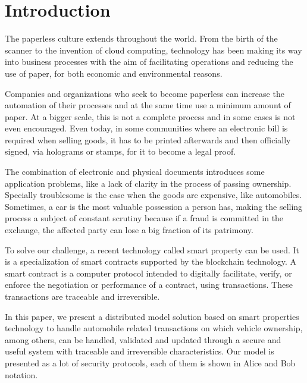 \section{Introduction}
The paperless culture extends throughout the world. 
From the birth of the scanner to the invention of cloud computing, 
technology has been making its way into business processes 
with the aim of facilitating operations and reducing the use of paper, 
for both economic and environmental reasons. 

Companies and organizations who seek to become paperless can increase the automation of their processes and at the same time use a minimum amount of paper.
At a bigger scale, this is not a complete process and in some cases is not even encouraged.
Even today, 
in some communities where an electronic bill is required when selling goods, 
it has to be printed afterwards and then officially signed, 
via holograms or stamps, 
for it to become a legal proof. 

The combination of electronic and physical documents introduces some application problems, 
like a lack of clarity in the process of passing ownership.
Specially troublesome is the case when the goods are expensive, like automobiles.
Sometimes, a car is the most valuable possession a person has, 
making the selling process a subject of constant scrutiny 
because if a fraud is committed in the exchange, 
the affected party can lose a big fraction of its patrimony.

To solve our challenge, a recent technology called smart property can be used. 
It is a specialization of 
smart contracts supported by the blockchain technology.
A smart contract is a computer protocol intended to digitally facilitate,
verify, or enforce the negotiation or performance of a
contract, using transactions. These transactions are traceable
and irreversible.


In this paper, 
we present a distributed model solution based on smart properties technology 
to handle automobile related transactions on which vehicle ownership, 
among others, can be handled, validated and updated through a 
secure and useful system with traceable and irreversible characteristics. 
Our model is presented as a lot of security protocols, each of them is shown
in Alice and Bob notation.

